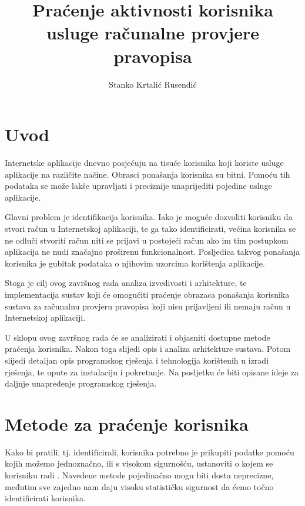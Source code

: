 \documentclass[times, utf8, zavrsni]{fer}
\begin{document}

\title{Praćenje aktivnosti korisnika usluge računalne provjere pravopisa}

\author{Stanko Krtalić Rusendić}

\maketitle


\zahvala{}

\tableofcontents

\chapter{Uvod}
Internetske aplikacije dnevno posjećuju na tisuće korisnika koji koriste
usluge aplikacije na različite načine. Obrasci ponašanja korisnika su bitni.
Pomoću tih podataka se može lakše upravljati i preciznije unaprijediti pojedine
usluge aplikacije.

Glavni problem je identifikacija korisnika. Iako je moguće dozvoliti korisniku
da stvori račun u Internetskoj aplikaciji, te ga tako identificirati, većina
korisnika se ne odluči stvoriti račun niti se prijavi u postojeći račun ako im
tim postupkom aplikacija ne nudi značajno proširenu funkcionalnost. Posljedica
takvog ponašanja korisnika je gubitak podataka o njihovim uzorcima korištenja
aplikacije.

Stoga je cilj ovog završnog rada analiza izvedivosti i arhitekture, te
implementacija sustav koji će omogućiti praćenje obrazaca ponašanja korisnika
sustava za računalnu provjeru pravopisa koji nisu prijavljeni ili nemaju račun u
Internetskoj aplikaciji.

U sklopu ovog završnog rada će se analizirati i objasniti dostupne metode
praćenja korisnika. Nakon toga slijedi opis i analiza arhitekture sustava.
Potom slijedi detaljan opis programskog rješenja i tehnologija korištenih u
izradi rješenja, te upute za instalaciju i pokretanje. Na posljetku će biti
opisane ideje za daljnje unapređenje programskog rješenja.

\chapter{Metode za praćenje korisnika}
Kako bi pratili, tj. identificirali, korisnika potrebno je prikupiti podatke
pomoću kojih možemo jednoznačno, ili s visokom sigurnošću, ustanoviti o kojem
se korisniku radi \cite{drj2015sansiscinfosecforum}. Navedene metode
pojedinačno mogu biti dosta neprecizne,
međutim sve zajedno nam daju visoku statističku sigurnost da ćemo točno
identificirati korisnika. \cite{janc2014tacim}
\end{document}
